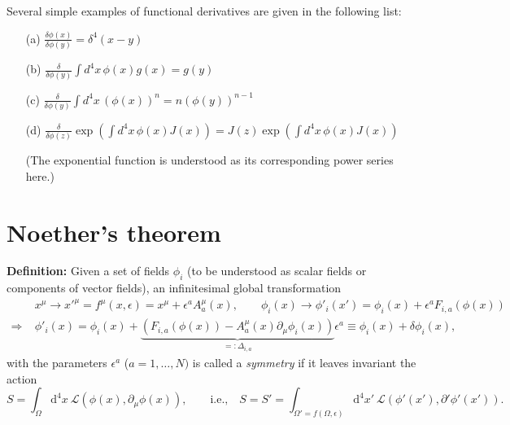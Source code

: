 \documentclass[prd,%
,superscriptaddress,%
nofootinbib,%
tightenlines ]{revtex4}
\newcommand{\dd}{\mathrm{d}}
\begin{document}
Several simple examples of functional derivatives are given in the following list:
\begin{itemize}
	\item[(a)] $\frac{\delta \phi(x)}{\delta \phi(y)} =  \delta^4(x-y)$
	\item[(b)] $\frac{\delta}{\delta \phi(y)} \int d^4 x\, \phi(x) g(x) = g(y)$
	\item[(c)] $\frac{\delta}{\delta \phi(y)} \int d^4 x\, (\phi(x))^n = n (\phi(y))^{n-1}$
	\item[(d)] $\frac{\delta}{\delta\phi\left(z\right)}\exp\left(\int d^4 x\,\phi\left(x\right)J\left(x\right)\right) = J(z) \exp\left(\int d^4 x\,\phi\left(x\right)J\left(x\right)\right)$
	
	(The exponential function is understood as its corresponding power series here.)
\end{itemize}

\section{Noether's theorem}
\label{B:Apendix}
\textbf{Definition:} Given a set of fields $\phi_i$ (to be understood as scalar fields or components of vector fields), an infinitesimal global transformation 
\begin{equation}
	\label{transformation}
	\begin{split}
		& x^\mu \rightarrow x'^\mu = f^\mu(x, \epsilon) = x^\mu + \epsilon^a A^\mu_a (x) , \qquad \phi_i (x) \rightarrow \phi'_i (x') = \phi_i (x) + \epsilon^a F_{i,a} (\phi(x)) \\
		\Rightarrow \; & \phi'_i (x) = \phi_i (x) + \underbrace{\left( F_{i,a} (\phi(x)) - A^\mu_a (x) \partial_\mu \phi_i (x) \right)}_{\displaystyle =: \Delta_{i,a}} \epsilon^a
		\equiv \phi_i (x) + \delta \phi_i (x),
	\end{split}
\end{equation}
with the parameters $\epsilon^a$ ($a = 1, \dots, N)$ is called a \textit{symmetry} if it leaves invariant the action
\begin{equation}
	\label{eq:action_invariance}
	S = \int_{\Omega} \dd^4 x \: \mathcal{L}(\phi(x), \partial_\mu \phi(x)) , \qquad \text{i.e.,} \quad
	S = S'
	= \int_{\Omega' = f(\Omega, \epsilon)} \dd^4 x' \: \mathcal{L}(\phi'(x'), \partial' \phi'(x')).
\end{equation}
\end{document}
